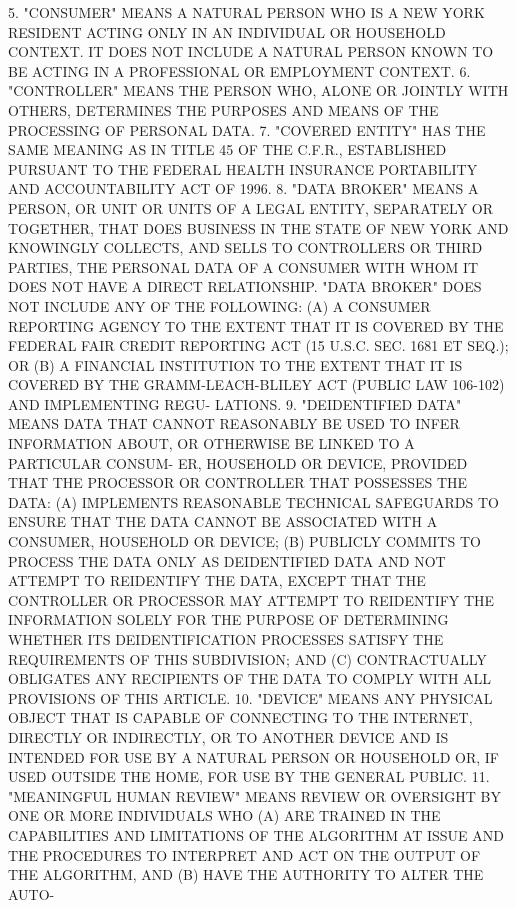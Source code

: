    5. "CONSUMER" MEANS A NATURAL PERSON WHO IS A NEW YORK RESIDENT ACTING
 ONLY  IN  AN  INDIVIDUAL  OR  HOUSEHOLD  CONTEXT.  IT DOES NOT INCLUDE A
 NATURAL PERSON KNOWN TO  BE  ACTING  IN  A  PROFESSIONAL  OR  EMPLOYMENT
 CONTEXT.
   6.  "CONTROLLER"  MEANS  THE PERSON WHO, ALONE OR JOINTLY WITH OTHERS,
 DETERMINES THE PURPOSES AND MEANS OF THE PROCESSING OF PERSONAL DATA.
   7. "COVERED ENTITY" HAS THE SAME MEANING AS IN TITLE 45 OF THE C.F.R.,
 ESTABLISHED PURSUANT TO THE FEDERAL  HEALTH  INSURANCE  PORTABILITY  AND
 ACCOUNTABILITY ACT OF 1996.
   8.  "DATA  BROKER" MEANS A PERSON, OR UNIT OR UNITS OF A LEGAL ENTITY,
 SEPARATELY OR TOGETHER, THAT DOES BUSINESS IN THE STATE OF NEW YORK  AND
 KNOWINGLY  COLLECTS,  AND  SELLS  TO  CONTROLLERS  OR THIRD PARTIES, THE
 PERSONAL DATA OF A  CONSUMER  WITH  WHOM  IT  DOES  NOT  HAVE  A  DIRECT
 RELATIONSHIP. "DATA BROKER" DOES NOT INCLUDE ANY OF THE FOLLOWING:
   (A)  A  CONSUMER  REPORTING AGENCY TO THE EXTENT THAT IT IS COVERED BY
 THE FEDERAL FAIR CREDIT REPORTING ACT (15 U.S.C. SEC. 1681 ET SEQ.); OR
   (B) A FINANCIAL INSTITUTION TO THE EXTENT THAT IT IS  COVERED  BY  THE
 GRAMM-LEACH-BLILEY  ACT  (PUBLIC  LAW  106-102)  AND  IMPLEMENTING REGU-
 LATIONS.
   9. "DEIDENTIFIED DATA" MEANS DATA THAT CANNOT REASONABLY  BE  USED  TO
 INFER  INFORMATION ABOUT, OR OTHERWISE BE LINKED TO A PARTICULAR CONSUM-
 ER, HOUSEHOLD OR DEVICE, PROVIDED THAT THE PROCESSOR OR CONTROLLER  THAT
 POSSESSES THE DATA:
   (A) IMPLEMENTS REASONABLE TECHNICAL SAFEGUARDS TO ENSURE THAT THE DATA
 CANNOT BE ASSOCIATED WITH A CONSUMER, HOUSEHOLD OR DEVICE;
   (B) PUBLICLY COMMITS TO PROCESS THE DATA ONLY AS DEIDENTIFIED DATA AND
 NOT  ATTEMPT  TO  REIDENTIFY  THE  DATA,  EXCEPT  THAT THE CONTROLLER OR
 PROCESSOR MAY ATTEMPT TO  REIDENTIFY  THE  INFORMATION  SOLELY  FOR  THE
 PURPOSE  OF  DETERMINING  WHETHER ITS DEIDENTIFICATION PROCESSES SATISFY
 THE REQUIREMENTS OF THIS SUBDIVISION; AND
   (C) CONTRACTUALLY OBLIGATES ANY RECIPIENTS OF THE DATA TO COMPLY  WITH
 ALL PROVISIONS OF THIS ARTICLE.
   10.  "DEVICE"  MEANS ANY PHYSICAL OBJECT THAT IS CAPABLE OF CONNECTING
 TO THE INTERNET, DIRECTLY OR INDIRECTLY, OR TO  ANOTHER  DEVICE  AND  IS
 INTENDED  FOR  USE  BY A NATURAL PERSON OR HOUSEHOLD OR, IF USED OUTSIDE
 THE HOME, FOR USE BY THE GENERAL PUBLIC.
   11. "MEANINGFUL HUMAN REVIEW" MEANS REVIEW OR OVERSIGHT BY ONE OR MORE
 INDIVIDUALS WHO (A) ARE TRAINED IN THE CAPABILITIES AND  LIMITATIONS  OF
 THE  ALGORITHM  AT  ISSUE AND THE PROCEDURES TO INTERPRET AND ACT ON THE
 OUTPUT OF THE ALGORITHM, AND (B) HAVE THE AUTHORITY TO ALTER  THE  AUTO-
